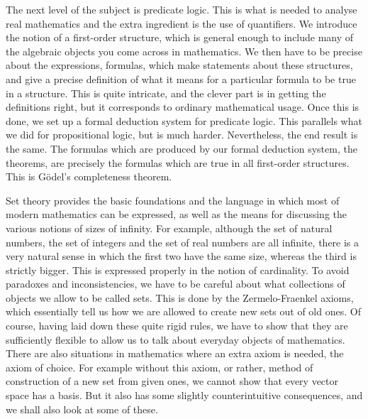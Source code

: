 The next level of the subject is predicate logic. This is what is needed to analyse real mathematics and the extra ingredient is the use of quantifiers. We introduce the notion of a first-order structure, which is general enough to include many of the algebraic objects you come across in mathematics. We then have to be precise about the expressions, formulas, which make statements about these structures, and give a precise definition of what it means for a particular formula to be true in a structure. This is quite intricate, and the clever part is in getting the definitions right, but it corresponds to ordinary mathematical usage. Once this is done, we set up a formal deduction system for predicate logic. This parallels what we did for propositional logic, but is much harder. Nevertheless, the end result is the same. The formulas which are produced by our formal deduction system, the theorems, are precisely the formulas which are true in all first-order structures. This is G\"odel's completeness theorem.

Set theory provides the basic foundations and the language in which most of modern mathematics can be expressed, as well as the means for discussing the various notions of sizes of infinity. For example, although the set of natural numbers, the set of integers and the set of real numbers are all infinite, there is a very natural sense in which the first two have the same size, whereas the third is strictly bigger. This is expressed properly in the notion of cardinality. To avoid paradoxes and inconsistencies, we have to be careful about what collections of objects we allow to be called sets. This is done by the Zermelo-Fraenkel axioms, which essentially tell us how we are allowed to create new sets out of old ones. Of course, having laid down these quite rigid rules, we have to show that they are sufficiently flexible to allow us to talk about everyday objects of mathematics. There are also situations in mathematics where an extra axiom is needed, the axiom of choice. For example without this axiom, or rather, method of construction of a new set from given ones, we cannot show that every vector space has a basis. But it also has some slightly counterintuitive consequences, and we shall also look at some of these.

